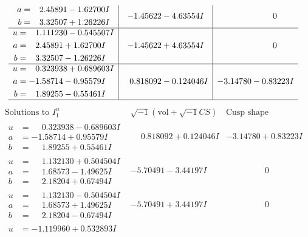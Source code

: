 \documentclass[1p]{elsarticle_modified}
\theoremstyle{definition}
\newcommand{\I}{\sqrt{-1}}
\begin{document}
$$\begin{array}{c|c|c}
\begin{aligned}
a &= \phantom{-}2.45891 - 1.62700 I \\
b &= \phantom{-}3.32507 + 1.26226 I\end{aligned}
 & -1.45622 - 4.63554 I & \phantom{-0.000000 } 0 \\ \hline\begin{aligned}
u &= \phantom{-}1.111230 - 0.545507 I \\
a &= \phantom{-}2.45891 + 1.62700 I \\
b &= \phantom{-}3.32507 - 1.26226 I\end{aligned}
 & -1.45622 + 4.63554 I & \phantom{-0.000000 } 0 \\ \hline\begin{aligned}
u &= \phantom{-}0.323938 + 0.689603 I \\
a &= -1.58714 - 0.95579 I \\
b &= \phantom{-}1.89255 - 0.55461 I\end{aligned}
 & \phantom{-}0.818092 - 0.124046 I & -3.14780 - 0.83223 I\\
 \hline 
 \end{array}$$\newpage$$\begin{array}{c|c|c}  
\text{Solutions to }I^u_{1}& \I (\text{vol} + \sqrt{-1}CS) & \text{Cusp shape}\\
 \hline 
\begin{aligned}
u &= \phantom{-}0.323938 - 0.689603 I \\
a &= -1.58714 + 0.95579 I \\
b &= \phantom{-}1.89255 + 0.55461 I\end{aligned}
 & \phantom{-}0.818092 + 0.124046 I & -3.14780 + 0.83223 I \\ \hline\begin{aligned}
u &= \phantom{-}1.132130 + 0.504504 I \\
a &= \phantom{-}1.68573 - 1.49625 I \\
b &= \phantom{-}2.18204 + 0.67494 I\end{aligned}
 & -5.70491 - 3.44197 I & \phantom{-0.000000 } 0 \\ \hline\begin{aligned}
u &= \phantom{-}1.132130 - 0.504504 I \\
a &= \phantom{-}1.68573 + 1.49625 I \\
b &= \phantom{-}2.18204 - 0.67494 I\end{aligned}
 & -5.70491 + 3.44197 I & \phantom{-0.000000 } 0 \\ \hline\begin{aligned}
u &= -1.119960 + 0.532893 I \\

\end{aligned}
\end{array}$$
\end{document}
